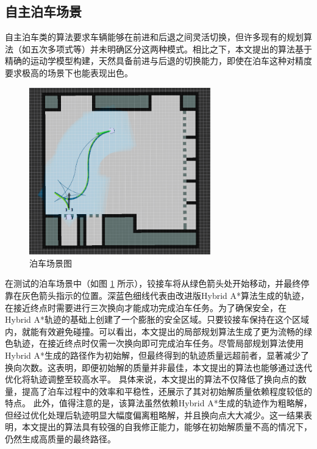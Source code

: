 \documentclass[master,academic]{ysuthesis} %
\begin{document}
		\subsection{自主泊车场景}
		自主泊车类的算法要求车辆能够在前进和后退之间灵活切换，但许多现有的规划算法（如五次多项式等）并未明确区分这两种模式。相比之下，本文提出的算法基于精确的运动学模型构建，天然具备前进与后退的切换能力，即使在泊车这种对精度要求极高的场景下也能表现出色。
		\begin{figure}[!ht]
			\centering
			\includegraphics[width=0.7\textwidth]{boche.png}
			\caption{泊车场景图}
			\label{fig:boche}
		\end{figure}
		在测试的泊车场景中（如图 \ref{fig:boche} 所示），铰接车将从绿色箭头处开始移动，并最终停靠在灰色箭头指示的位置。深蓝色细线代表由改进版Hybrid A*算法生成的轨迹，在接近终点时需要进行三次换向才能成功完成泊车任务。为了确保安全，在Hybrid A*轨迹的基础上创建了一个膨胀的安全区域。只要铰接车保持在这个区域内，就能有效避免碰撞。可以看出，本文提出的局部规划算法生成了更为流畅的绿色轨迹，在接近终点时仅需一次换向即可完成泊车任务。尽管局部规划算法使用Hybrid A*生成的路径作为初始解，但最终得到的轨迹质量远超前者，显著减少了换向次数。这表明，即便初始解的质量并非最佳，本文提出的算法也能够通过迭代优化将轨迹调整至较高水平。
		具体来说，本文提出的算法不仅降低了换向点的数量，提高了泊车过程中的效率和平稳性，还展示了其对初始解质量依赖程度较低的特点。
		此外，值得注意的是，该算法虽然依赖Hybrid A*生成的轨迹作为粗略解，但经过优化处理后轨迹明显大幅度偏离粗略解，并且换向点大大减少。这一结果表明，本文提出的算法具有较强的自我修正能力，能够在初始解质量不高的情况下，仍然生成高质量的最终路径。
\end{document}
